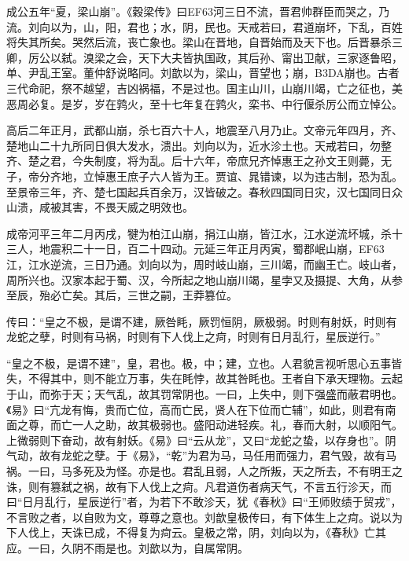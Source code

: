 \documentclass[]{article}
\begin{document}
成公五年``夏，梁山崩''。《穀梁传》曰EF63河三日不流，晋君帅群臣而哭之，乃流。刘向以为，山，阳，君也；水，阴，民也。天戒若曰，君道崩坏，下乱，百姓将失其所矣。哭然后流，丧亡象也。梁山在晋地，自晋始而及天下也。后晋暴杀三卿，厉公以弑。溴梁之会，天下大夫皆执国政，其后孙、甯出卫献，三家逐鲁昭，单、尹乱王室。董仲舒说略同。刘歆以为，梁山，晋望也；崩，B3DA崩也。古者三代命祀，祭不越望，吉凶祸福，不是过也。国主山川，山崩川竭，亡之征也，美恶周必复。是岁，岁在鹑火，至十七年复在鹑火，栾书、中行偃杀厉公而立悼公。

高后二年正月，武都山崩，杀七百六十人，地震至八月乃止。文帝元年四月，齐、楚地山二十九所同日俱大发水，溃出。刘向以为，近水沴土也。天戒若曰，勿整齐、楚之君，今失制度，将为乱。后十六年，帝庶兄齐悼惠王之孙文王则薨，无子，帝分齐地，立悼惠王庶子六人皆为王。贾谊、晁错谏，以为违古制，恐为乱。至景帝三年，齐、楚七国起兵百余万，汉皆破之。春秋四国同日灾，汉七国同日众山溃，咸被其害，不畏天威之明效也。

成帝河平三年二月丙戌，犍为柏江山崩，捐江山崩，皆江水，江水逆流坏城，杀十三人，地震积二十一日，百二十四动。元延三年正月丙寅，蜀郡岷山崩，EF63江，江水逆流，三日乃通。刘向以为，周时岐山崩，三川竭，而幽王亡。岐山者，周所兴也。汉家本起于蜀、汉，今所起之地山崩川竭，星孛又及摄提、大角，从参至辰，殆必亡矣。其后，三世之嗣，王莽篡位。

传曰：``皇之不极，是谓不建，厥咎眊，厥罚恒阴，厥极弱。时则有射妖，时则有龙蛇之孽，时则有马祸，时则有下人伐上之疴，时则有日月乱行，星辰逆行。''

``皇之不极，是谓不建''，皇，君也。极，中；建，立也。人君貌言视听思心五事皆失，不得其中，则不能立万事，失在眊悖，故其咎眊也。王者自下承天理物。云起于山，而弥于天；天气乱，故其罚常阴也。一曰，上失中，则下强盛而蔽君明也。《易》曰``亢龙有悔，贵而亡位，高而亡民，贤人在下位而亡辅''，如此，则君有南面之尊，而亡一人之助，故其极弱也。盛阳动进轻疾。礼，春而大射，以顺阳气。上微弱则下奋动，故有射妖。《易》曰``云从龙''，又曰``龙蛇之蛰，以存身也''。阴气动，故有龙蛇之孽。于《易》，``乾''为君为马，马任用而强力，君气毁，故有马祸。一曰，马多死及为怪。亦是也。君乱且弱，人之所叛，天之所去，不有明王之诛，则有篡弑之祸，故有下人伐上之疴。凡君道伤者病天气，不言五行沴天，而曰``日月乱行，星辰逆行''者，为若下不敢沴天，犹《春秋》曰``王师败绩于贸戎''，不言败之者，以自败为文，尊尊之意也。刘歆皇极传曰，有下体生上之疴。说以为下人伐上，天诛已成，不得复为疴云。皇极之常，阴，刘向以为，《春秋》亡其应。一曰，久阴不雨是也。刘歆以为，自属常阴。
\end{document}
